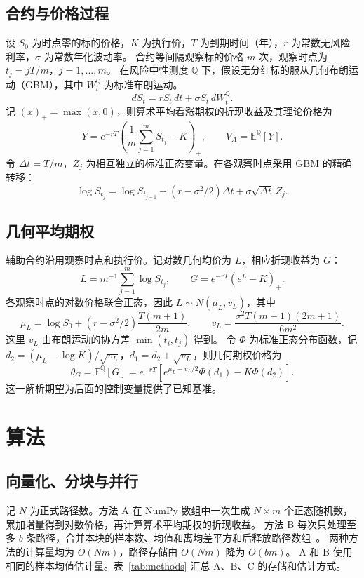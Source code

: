 \subsection{合约与价格过程}
设 \(S_0\) 为时点零的标的价格，\(K\) 为执行价，\(T\) 为到期时间（年），\(r\) 为常数无风险利率，\(\sigma\) 为常数年化波动率。
合约等间隔观察标的价格 \(m\) 次，观察时点为 \(t_j=jT/m\)，\(j=1,\ldots,m\)。
在风险中性测度 \(\mathbb Q\) 下，假设无分红标的服从几何布朗运动（GBM），其中 \(W_t^{\mathbb Q}\) 为标准布朗运动。
\begin{equation}
dS_t=rS_t\,dt+\sigma S_t\,dW_t^{\mathbb Q}.
\label{eq:gbm}
\end{equation}
记 \((x)_+=\max(x,0)\)，则算术平均看涨期权的折现收益及其理论价格为
\begin{equation}
Y=e^{-rT}\left(\frac1m\sum_{j=1}^{m}S_{t_j}-K\right)_+,
\qquad V_A=\mathbb E^{\mathbb Q}[Y].
\label{eq:target}
\end{equation}
令 \(\Delta t=T/m\)，\(Z_j\) 为相互独立的标准正态变量。在各观察时点采用 GBM 的精确转移：
\begin{equation}
\log S_{t_j}=\log S_{t_{j-1}}+
(r-\sigma^2/2)\Delta t+\sigma\sqrt{\Delta t}\,Z_j.
\label{eq:transition}
\end{equation}

\subsection{几何平均期权}
辅助合约沿用观察时点和执行价。记对数几何均价为 \(L\)，相应折现收益为 \(G\)：
\[
L=m^{-1}\sum_{j=1}^{m}\log S_{t_j},\qquad G=e^{-rT}(e^L-K)_+.
\]
各观察时点的对数价格联合正态，因此 \(L\sim N(\mu_L,v_L)\)，其中
\begin{equation}
\mu_L=\log S_0+(r-\sigma^2/2)\frac{T(m+1)}{2m},
\qquad
v_L=\frac{\sigma^2T(m+1)(2m+1)}{6m^2}.
\end{equation}
这里 \(v_L\) 由布朗运动的协方差 \(\min(t_i,t_j)\) 得到。
令 \(\Phi\) 为标准正态分布函数，记 \(d_2=(\mu_L-\log K)/\sqrt{v_L}\)，\(d_1=d_2+\sqrt{v_L}\)，则几何期权价格为
\begin{equation}
\theta_G=\mathbb E^{\mathbb Q}[G]
=e^{-rT}\left[e^{\mu_L+v_L/2}\Phi(d_1)-K\Phi(d_2)\right].
\label{eq:geometric}
\end{equation}
这一解析期望为后面的控制变量提供了已知基准。

\section{算法}
\subsection{向量化、分块与并行}
记 \(N\) 为正式路径数。方法 A 在 NumPy 数组中一次生成 \(N\times m\) 个正态随机数，累加增量得到对数价格，再计算算术平均期权的折现收益。
方法 B 每次只处理至多 \(b\) 条路径，合并本块的样本数、均值和离均差平方和后释放路径数组~\cite{chan}。
两种方法的计算量均为 \(O(Nm)\)，路径存储由 \(O(Nm)\) 降为 \(O(bm)\)。
A 和 B 使用相同的样本均值估计量。表~\ref{tab:methods} 汇总 A、B、C 的存储和估计方式。

